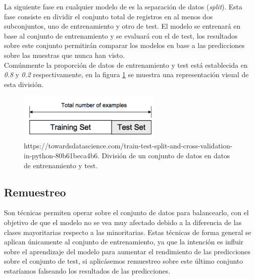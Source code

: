 \begin{enumerate}
                    La siguiente fase en cualquier modelo de  es la separación de datos (\textit{split}). Esta fase consiste en dividir el conjunto total de registros en al menos dos subconjuntos, uno de entrenamiento y otro de test. El modelo se entrenará en base al conjunto de entrenamiento y se evaluará con el de test, los resultados sobre este conjunto permitirán comparar los modelos en base a las predicciones sobre las muestras que nunca han visto.\\


                    Comúnmente la proporción de datos de entrenamiento y test está establecida en \textit{0.8} y \textit{0.2} respectivamente, en la figura \ref{DataSplitImage} se muestra una representación visual de esta división.


                    \begin{figure}[h]
                        \centering
                        \includegraphics[width=7cm]{archivos/4.Metodologia/Datos/Separacion/DataSplit}
                        \caption{https://towardsdatascience.com/train-test-split-and-cross-validation-in-python-80b61beca4b6. División de un conjunto de datos en datos de entrenamiento y test.}
                        \label{DataSplitImage}
                     \end{figure}

            \end{enumerate}



        \subsection{Remuestreo}


            Son técnicas permiten operar sobre el conjunto de datos para balancearlo, con el objetivo de que el modelo no se vea muy afectado debido a la diferencia de las clases mayoritarias respecto a las minoritarias. Estas técnicas de forma general se aplican únicamente al conjunto de entrenamiento, ya que la intención  es influir sobre el aprendizaje del modelo para aumentar el rendimiento de las predicciones sobre el conjunto de test, si aplicásemos remuestreo sobre este último conjunto estaríamos falseando los resultados de las predicciones.


